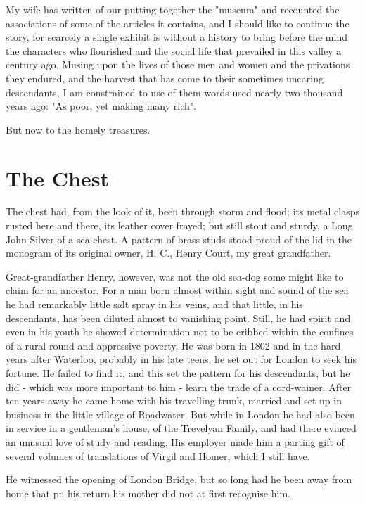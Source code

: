 
My wife has written of our putting together the "museum" and recounted the associations of some of the articles it contains, and I should like to continue the story, for scarcely a single exhibit is without a history to bring before the mind the characters who flourished and the social life that prevailed in this valley a century ago. Musing upon the lives of those men and women and the privations they endured, and the harvest that has come to their sometimes uncaring descendants, I am constrained to use of them words used nearly two thousand years ago: "As poor, yet making many rich".

But now to the homely treasures.
 
\section{The Chest} 
 
The chest had, from the look of it, been through storm and flood; its metal clasps rusted here and there, its leather cover frayed; but still stout and sturdy, a Long John Silver of a sea-chest. A pattern of brass studs stood proud of the lid in the monogram of its original owner, H. C., Henry Court, my great grandfather.

Great-grandfather Henry, however, was not the old sea-dog some might like to claim for an ancestor. For a man born almost within sight and sound of the sea he had remarkably little salt spray in his veins, and that little, in his descendants, has been diluted almost to vanishing point. Still, he had spirit and even in his youth he showed determination not to be cribbed within the confines of a rural round and appressive poverty. He was born in 1802 and in the hard years after Waterloo, probably in his late teens, he set out for London to seek his fortune. He failed to find it, and this set the pattern for his descendants, but he did - which was more important to him - learn the trade of a cord-wainer. After ten years away he came home with his travelling trunk, married and set up in business in the little village of Roadwater. But while in London he had also been in service in a gentleman's house, of the Trevelyan Family, and had there evinced an unusual love of study and reading. His employer made him a parting gift of several volumes of translations of Virgil and Homer, which I still have.

He witnessed the opening of London Bridge, but so long had he been away from home that pn his return his mother did not at first recognise him.

